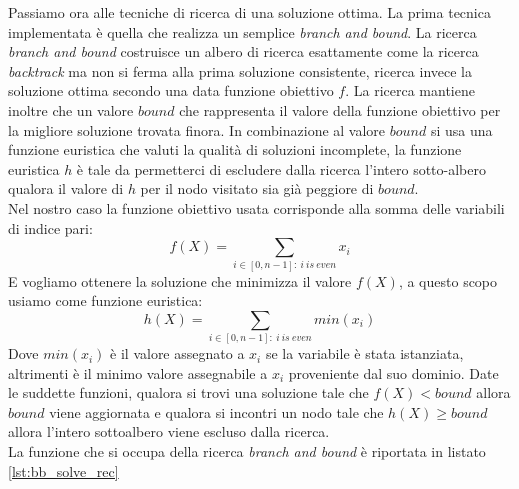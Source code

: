 \documentclass[10pt, a4paper]{article}
\begin{document}
Passiamo ora alle tecniche di ricerca di una soluzione ottima. La prima tecnica implementata è quella che realizza un semplice \textit{branch and bound}. La ricerca \textit{branch and bound} costruisce un albero di ricerca esattamente come la ricerca \textit{backtrack} ma non si ferma alla prima soluzione consistente, ricerca invece la soluzione ottima secondo una data funzione obiettivo $f$. La ricerca mantiene inoltre che un valore $bound$ che rappresenta il valore della funzione obiettivo per la migliore soluzione trovata finora. In combinazione al valore $bound$ si usa una funzione euristica che valuti la qualità di soluzioni incomplete, la funzione euristica $h$ è tale da permetterci di escludere dalla ricerca l'intero sotto-albero qualora il valore di $h$ per il nodo visitato sia già peggiore di $bound$.\\
Nel nostro caso la funzione obiettivo usata corrisponde alla somma delle variabili di indice pari:
\begin{equation*}
f(X) = \sum_{i \in [0,n-1]:~i~is~even} x_i
\end{equation*}
E vogliamo ottenere la soluzione che minimizza il valore $f(X)$, a questo scopo usiamo come funzione euristica:
\begin{equation*}
h(X) = \sum_{i \in [0,n-1]:~i~is~even} min(x_i)
\end{equation*}
Dove $min(x_i)$ è il valore assegnato a $x_i$ se la variabile è stata istanziata, altrimenti è il minimo valore assegnabile a $x_i$ proveniente dal suo dominio. Date le suddette funzioni, qualora si trovi una soluzione tale che $f(X) < bound$ allora $bound$ viene aggiornata e qualora si incontri un nodo tale che $h(X) \geq bound$ allora l'intero sottoalbero viene escluso dalla ricerca.\\
La funzione che si occupa della ricerca \textit{branch and bound} è riportata in listato \ref{lst:bb_solve_rec}
\end{document}
